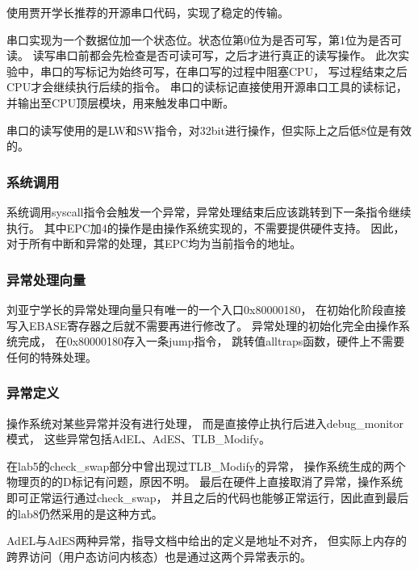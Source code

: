             使用贾开学长推荐的开源串口代码，实现了稳定的传输。

            串口实现为一个数据位加一个状态位。状态位第0位为是否可写，第1位为是否可读。%
            读写串口前都会先检查是否可读可写，之后才进行真正的读写操作。%
            此次实验中，串口的写标记为始终可写，在串口写的过程中阻塞CPU，%
            写过程结束之后CPU才会继续执行后续的指令。%
            串口的读标记直接使用开源串口工具的读标记，并输出至CPU顶层模块，用来触发串口中断。

            串口的读写使用的是LW和SW指令，对32bit进行操作，但实际上之后低8位是有效的。

        \subsubsection{系统调用}
            系统调用syscall指令会触发一个异常，异常处理结束后应该跳转到下一条指令继续执行。%
            其中EPC加4的操作是由操作系统实现的，不需要提供硬件支持。%
            因此，对于所有中断和异常的处理，其EPC均为当前指令的地址。

        \subsubsection{异常处理向量}
            刘亚宁学长的异常处理向量只有唯一的一个入口0x80000180，%
            在初始化阶段直接写入EBASE寄存器之后就不需要再进行修改了。%
            异常处理的初始化完全由操作系统完成，%
            在0x80000180存入一条jump指令，%
            跳转值alltraps函数，硬件上不需要任何的特殊处理。%

        \subsubsection{异常定义}
            操作系统对某些异常并没有进行处理，%
            而是直接停止执行后进入debug\_monitor模式，%
            这些异常包括AdEL、AdES、TLB\_Modify。

            在lab5的check\_swap部分中曾出现过TLB\_Modify的异常，%
            操作系统生成的两个物理页的的D标记有问题，原因不明。%
            最后在硬件上直接取消了异常，操作系统即可正常运行通过check\_swap，%
            并且之后的代码也能够正常运行，因此直到最后的lab8仍然采用的是这种方式。%

            AdEL与AdES两种异常，指导文档中给出的定义是地址不对齐，%
            但实际上内存的跨界访问（用户态访问内核态）也是通过这两个异常表示的。

